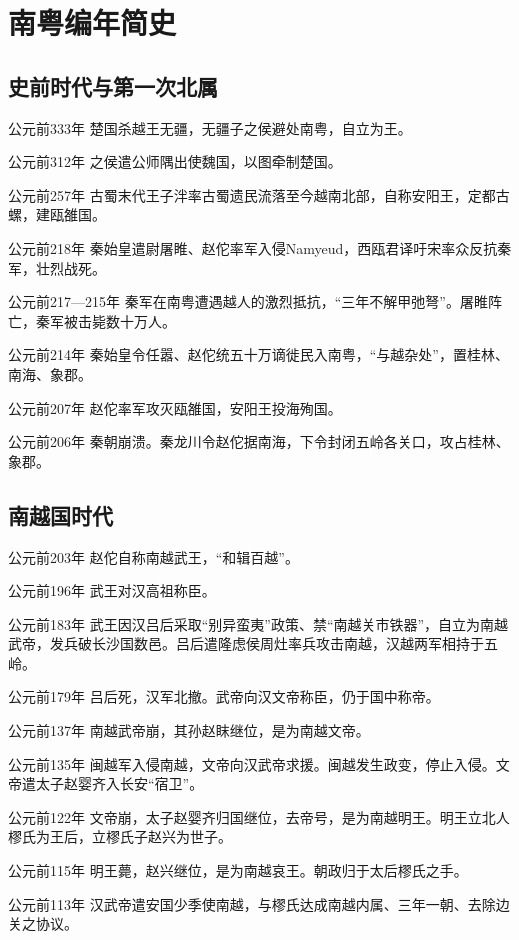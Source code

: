 
\chapter{南粤编年简史}

\section*{史前时代与第一次北属}

公元前333年 楚国杀越王无疆，无疆子之侯避处南粤，自立为王。

公元前312年 之侯遣公师隅出使魏国，以图牵制楚国。

公元前257年 古蜀末代王子泮率古蜀遗民流落至今越南北部，自称安阳王，定都古螺，建瓯雒国。

公元前218年 秦始皇遣尉屠睢、赵佗率军入侵Namyeud，西瓯君译吁宋率众反抗秦军，壮烈战死。

公元前217—215年 秦军在南粤遭遇越人的激烈抵抗，“三年不解甲弛弩”。屠睢阵亡，秦军被击毙数十万人。

公元前214年 秦始皇令任嚣、赵佗统五十万谪徙民入南粤，“与越杂处”，置桂林、南海、象郡。

公元前207年 赵佗率军攻灭瓯雒国，安阳王投海殉国。

公元前206年 秦朝崩溃。秦龙川令赵佗据南海，下令封闭五岭各关口，攻占桂林、象郡。

\section*{南越国时代}

公元前203年 赵佗自称南越武王，“和辑百越”。

公元前196年 武王对汉高祖称臣。

公元前183年 武王因汉吕后采取“别异蛮夷”政策、禁“南越关市铁器”，自立为南越武帝，发兵破长沙国数邑。吕后遣隆虑侯周灶率兵攻击南越，汉越两军相持于五岭。

公元前179年 吕后死，汉军北撤。武帝向汉文帝称臣，仍于国中称帝。

公元前137年 南越武帝崩，其孙赵眜继位，是为南越文帝。

公元前135年 闽越军入侵南越，文帝向汉武帝求援。闽越发生政变，停止入侵。文帝遣太子赵婴齐入长安“宿卫”。

公元前122年 文帝崩，太子赵婴齐归国继位，去帝号，是为南越明王。明王立北人樛氏为王后，立樛氏子赵兴为世子。

公元前115年 明王薨，赵兴继位，是为南越哀王。朝政归于太后樛氏之手。

公元前113年 汉武帝遣安国少季使南越，与樛氏达成南越内属、三年一朝、去除边关之协议。


